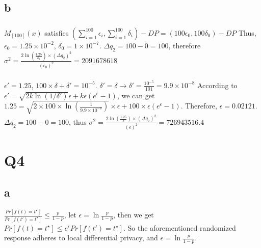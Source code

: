 \documentclass[12pt]{article}
\begin{document}
\subsection{b}
\subsubsection{}
$M_{[100]}(x)$ satisfies $(\sum\limits_{i=1}^{100}\epsilon_i, \sum\limits_{i=1}^{100}\delta_i)-DP=(100\epsilon_0 ,100\delta_0)-DP$
\newline
Thus, $\epsilon_0=1.25\times 10^{-2}$, $\delta_0=1\times 10^{-7}$. $\Delta q_2=100-0=100$, therefore $\sigma^2=\frac{2\ln (\frac{1.25}{\delta_0})\times (\Delta q_2)^2}{(\epsilon_0)^2}=2091678618$
\subsubsection{}
$\epsilon '=1.25$, $100\times \delta+\delta '=10^{-5}$. $\delta '=\delta\rightarrow\delta '=\frac{10^{-5}}{101}=9.9\times 10^{-8}$
\newline
According to $\epsilon '=\sqrt{2k\ln (1/\delta ')}\epsilon+k\epsilon(e^\epsilon-1)$, we can get $1.25=\sqrt{2\times 100\times\ln (\frac{1}{9.9\times 10^{-8}})}\times \epsilon+100\times \epsilon (e^{\epsilon}-1)$. Therefore, $\epsilon=0.02121$. $\Delta q_2=100-0=100$, thus $\sigma^2=\frac{2\ln (\frac{1.25}{\delta})\times (\Delta q_2)^2}{(\epsilon)^2}=726943516.4$

\section{Q4}
\subsection{a}
$\frac{Pr[f(t)=t^{\star}]}{Pr[f(t')=t^{\star}]}\leq \frac{p}{1-p}$, let $\epsilon=\ln \frac{p}{1-p}$, then we get $Pr[f(t)=t^{\star}]\leq e^{\epsilon}Pr[f(t')=t^{\star}]$. So the aforementioned randomized response adheres to local differential privacy, and $\epsilon=\ln \frac{p}{1-p}$.
\end{document}
